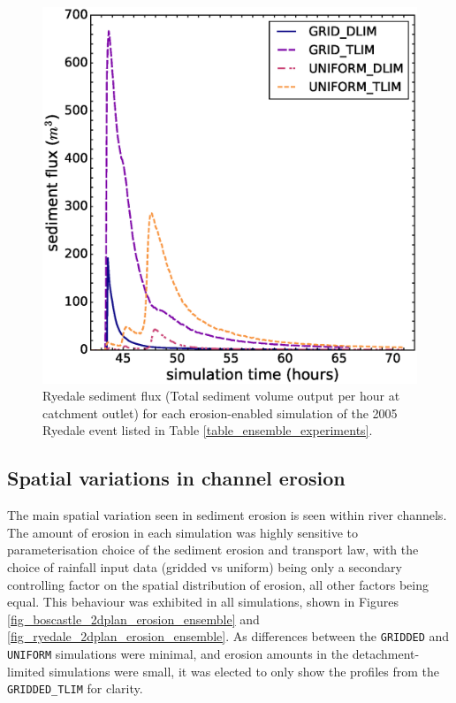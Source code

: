 \begin{figure}[t]
\includegraphics[width=14cm]{chp06_figures_scripts/figure_ryedale_sedigraph_ensemble.eps}
\caption{Ryedale sediment flux (Total sediment volume output per hour at catchment outlet) for each erosion-enabled simulation of the 2005 Ryedale event listed in Table \ref{table_ensemble_experiments}.}
\label{fig_ryedale_sedigraph_ensemble}
\end{figure}

\subsection{Spatial variations in channel erosion}
The main spatial variation seen in sediment erosion is seen within river channels. The amount of erosion in each simulation was highly sensitive to parameterisation choice of the sediment erosion and transport law, with the choice of rainfall input data (gridded vs uniform) being only a secondary controlling factor on the spatial distribution of erosion, all other factors being equal. This behaviour was exhibited in all simulations, shown in Figures \ref{fig_boscastle_2dplan_erosion_ensemble} and \ref{fig_ryedale_2dplan_erosion_ensemble}.  As differences between the \texttt{GRIDDED} and \texttt{UNIFORM} simulations were minimal, and erosion amounts in the detachment-limited simulations were small, it was elected to only show the profiles from the \texttt{GRIDDED\_TLIM} for clarity.

